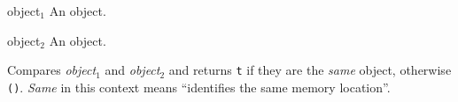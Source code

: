 \begin{optDefinition}


\begin{arguments}
\item[object$_1$] An object.
\item[object$_2$] An object.
\end{arguments}

\result%
Compares {\em object$_1$} and {\em object$_2$} and returns {\tt t} if
they are the {\em same\/} object, otherwise {\tt ()}.  {\em Same\/} in
this context means ``identifies the same memory location''.


\end{optDefinition}
